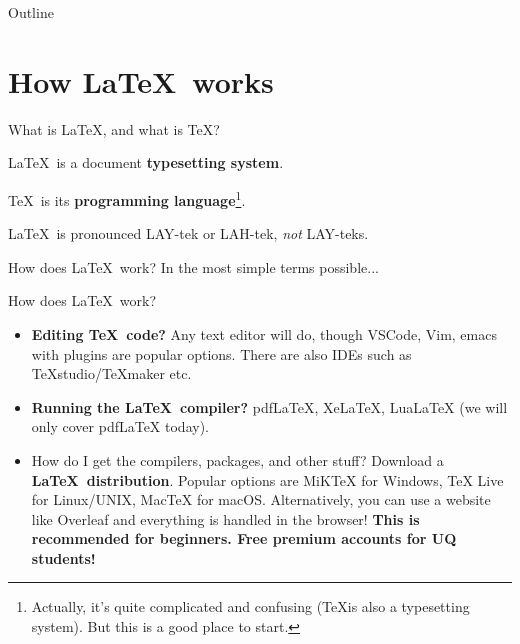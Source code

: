 \documentclass[aspectratio=43, 10pt]{beamer}
\begin{document}
\begin{frame}{Outline}
\begin{multicols}{2}
	\tableofcontents
	\end{multicols}	
\end{frame}

\section{How \LaTeX \ works}

\begin{frame}{What is \LaTeX, and what is \TeX?}

\LaTeX \ is a document \textbf{typesetting system}.

\TeX \ is its \textbf{programming language}\footnote{Actually, it's quite complicated and confusing (\TeX is also a typesetting system). But this is a good place to start.}.

\LaTeX \ is pronounced LAY-tek or LAH-tek, \textit{not} LAY-teks.
\end{frame}

\begin{frame}[fragile]{How does \LaTeX \ work?}
In the most simple terms possible...

\end{frame}

\begin{frame}{How does \LaTeX \ work?}
	\begin{itemize}
		\item<1-> \textbf{Editing \TeX \ code?} Any text editor will do, though VSCode, Vim, emacs with plugins are popular options. There are also IDEs such as TeXstudio/TeXmaker etc.
		\item<2-> \textbf{Running the \LaTeX \ compiler?} pdfLaTeX, XeLaTeX, LuaLaTeX (we will only cover pdfLaTeX today).
		\item<3-> How do I get the compilers, packages, and other stuff? Download a \textbf{\LaTeX \ distribution}. Popular options are MiKTeX for Windows, TeX Live for Linux/UNIX, MacTeX for macOS. Alternatively, you can use a website like Overleaf and everything is handled in the browser! \textbf{This is recommended for beginners. Free premium accounts for UQ students!}
	\end{itemize}
\end{frame}
\end{document}
